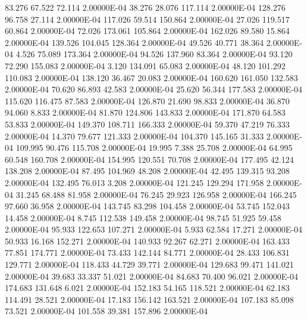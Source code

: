     83.276    67.522    72.114  2.00000E-04
    38.276    28.076   117.114  2.00000E-04
   128.276    96.758    27.114  2.00000E-04
   117.026    59.514   150.864  2.00000E-04
    27.026   119.517    60.864  2.00000E-04
    72.026   173.061   105.864  2.00000E-04
   162.026    89.580    15.864  2.00000E-04
   139.526   104.045   128.364  2.00000E-04
    49.526    40.771    38.364  2.00000E-04
     4.526    75.089   173.364  2.00000E-04
    94.526   137.960    83.364  2.00000E-04
    93.120    72.290   155.083  2.00000E-04
     3.120   134.091    65.083  2.00000E-04
    48.120   101.292   110.083  2.00000E-04
   138.120    36.467    20.083  2.00000E-04
   160.620   161.050   132.583  2.00000E-04
    70.620    86.893    42.583  2.00000E-04
    25.620    56.344   177.583  2.00000E-04
   115.620   116.475    87.583  2.00000E-04
   126.870    21.690    98.833  2.00000E-04
    36.870    94.060     8.833  2.00000E-04
    81.870   124.806   143.833  2.00000E-04
   171.870    64.583    53.833  2.00000E-04
   149.370   108.711   166.333  2.00000E-04
    59.370    47.219    76.333  2.00000E-04
    14.370    79.677   121.333  2.00000E-04
   104.370   145.165    31.333  2.00000E-04
   109.995    90.476   115.708  2.00000E-04
    19.995     7.388    25.708  2.00000E-04
    64.995    60.548   160.708  2.00000E-04
   154.995   120.551    70.708  2.00000E-04
   177.495    42.124   138.208  2.00000E-04
    87.495   104.969    48.208  2.00000E-04
    42.495   139.315    93.208  2.00000E-04
   132.495    76.013     3.208  2.00000E-04
   121.245   129.294   171.958  2.00000E-04
    31.245    68.488    81.958  2.00000E-04
    76.245    29.923   126.958  2.00000E-04
   166.245    97.660    36.958  2.00000E-04
   143.745    83.298   104.458  2.00000E-04
    53.745   152.043    14.458  2.00000E-04
     8.745   112.538   149.458  2.00000E-04
    98.745    51.925    59.458  2.00000E-04
    95.933   122.653   107.271  2.00000E-04
     5.933    62.584    17.271  2.00000E-04
    50.933    16.168   152.271  2.00000E-04
   140.933    92.267    62.271  2.00000E-04
   163.433    77.851   174.771  2.00000E-04
    73.433   142.144    84.771  2.00000E-04
    28.433   106.831   129.771  2.00000E-04
   118.433    44.729    39.771  2.00000E-04
   129.683    99.471   141.021  2.00000E-04
    39.683    33.337    51.021  2.00000E-04
    84.683    70.400    96.021  2.00000E-04
   174.683   131.648     6.021  2.00000E-04
   152.183    54.165   118.521  2.00000E-04
    62.183   114.491    28.521  2.00000E-04
    17.183   156.142   163.521  2.00000E-04
   107.183    85.098    73.521  2.00000E-04
   101.558    39.381   157.896  2.00000E-04
